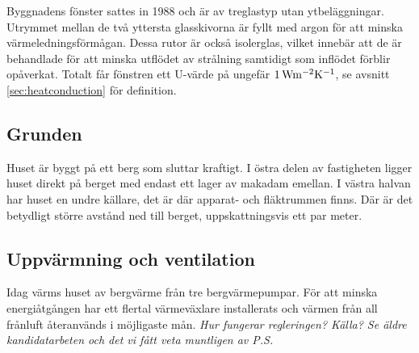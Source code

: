 Byggnadens fönster sattes in 1988 och är av treglastyp utan ytbeläggningar. Utrymmet mellan de två yttersta glasskivorna är fyllt med argon för att minska värmeledningsförmågan. Dessa rutor är också isolerglas, vilket innebär att de är behandlade för att minska utflödet av strålning samtidigt som inflödet förblir opåverkat.  Totalt får fönstren ett U-värde på ungefär $\unit[1]{Wm^{-2}K^{-1}}$, se avsnitt \ref{sec:heatconduction} för definition. 

\subsection{Grunden}

Huset är byggt på ett berg som sluttar kraftigt. I östra delen av fastigheten ligger huset direkt på berget med endast ett lager av makadam emellan\cite{petersarneo}. I västra halvan har huset en undre källare, det är där apparat- och fläktrummen finns. Där är det betydligt större avstånd ned till berget, uppskattningsvis ett par meter. %

\subsection{Uppvärmning och ventilation}
Idag värms huset av bergvärme från tre bergvärmepumpar. För att minska energiåtgången har ett flertal värmeväxlare installerats och värmen från all frånluft återanvänds i möjligaste mån.
\emph{\color{red} Hur fungerar regleringen? Källa?
Se äldre kandidatarbeten och det vi fått veta muntligen av P.S.}
